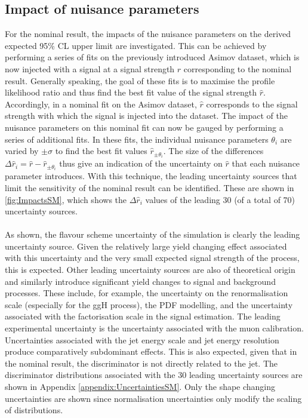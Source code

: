 \subsection{Impact of nuisance parameters}
For the nominal result, the impacts of the nuisance parameters on the derived expected 95\% CL upper limit are investigated. This can be achieved by performing a series of fits on the previously introduced Asimov dataset, which is now injected with a \cHZZ signal at a signal strength $r$ corresponding to the nominal result. Generally speaking, the goal of these fits is to maximise the profile likelihood ratio and thus find the best fit value of the \cHZZsen signal strength $\hat{r}$. Accordingly, in a nominal fit on the Asimov dataset, $\hat{r}$ corresponds to the signal strength with which the \cHZZsen signal is injected into the dataset. The impact of the nuisance parameters on this nominal fit can now be gauged by performing a series of additional fits. In these fits, the individual nuisance parameters $\theta_i$ are varied by $\pm \sigma$ to find the best fit values $\hat{r}_{\pm\theta_i}$. The size of the differences $\Delta \hat{r}_i = \hat{r} - \hat{r}_{\pm\theta_i}$ thus give an indication of the uncertainty on $\hat{r}$ that each nuisance parameter introduces. With this technique, the leading uncertainty sources that limit the sensitivity of the nominal result can be identified. These are shown in \autoref{fig:ImpactsSM}, which shows the $\Delta \hat{r}_i$ values of the leading 30 (of a total of 70) uncertainty sources. \\
\\
As shown, the flavour scheme uncertainty of the \cHZZsen simulation is clearly the leading uncertainty source. Given the relatively large yield changing effect associated with this uncertainty and the very small expected signal strength of the \cHZZsen process, this is expected. Other leading uncertainty sources are also of theoretical origin and similarly introduce significant yield changes to signal and background processes. These include, for example, the uncertainty on the renormalisation scale (especially for the ggH process), the PDF modelling, and the uncertainty associated with the factorisation scale in the signal estimation. The leading experimental uncertainty is the uncertainty associated with the muon calibration. Uncertainties associated with the jet energy scale and jet energy resolution produce comparatively subdominant effects. This is also expected, given that in the nominal result, the discriminator is not directly related to the jet. The discriminator distributions associated with the 30 leading uncertainty sources are shown in Appendix \autoref{appendix:UncertaintiesSM}. Only the shape changing uncertainties are shown since normalisation uncertainties only modify the scaling of distributions. \\

